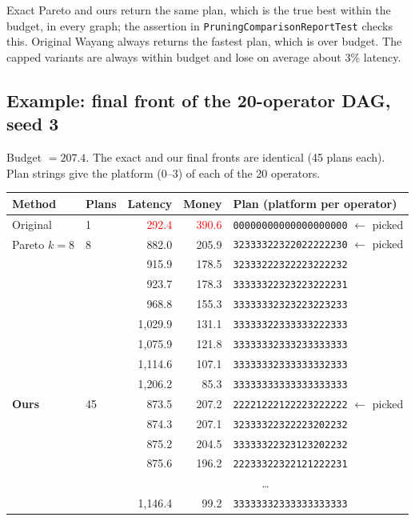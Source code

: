 \documentclass[10pt,a4paper]{article}
\begin{document}
\noindent
Exact Pareto and ours return the same plan, which is the true best within the budget, in every graph; the assertion
in \texttt{PruningComparisonReportTest} checks this. Original Wayang always returns the fastest plan, which is over budget.
The capped variants are always within budget and lose on average about 3\% latency.

\subsection{Example: final front of the 20-operator DAG, seed 3}
Budget $= 207.4$. The exact and our final fronts are identical (45 plans each). Plan strings give the platform (0--3) of each of the 20 operators.
\begin{center}\small
\begin{tabular}{@{}llrrl@{}}
\toprule
Method & Plans & Latency & Money & Plan (platform per operator)\\
\midrule
Original & 1 & \textcolor{red}{292.4} & \textcolor{red}{390.6} & \texttt{00000000000000000000} $\leftarrow$ picked\\
\midrule
Pareto $k{=}8$ & 8 & {882.0} & {205.9} & \texttt{32333322322022222230} $\leftarrow$ picked\\
 &  & {915.9} & {178.5} & \texttt{32333222322223222232}\\
 &  & {923.7} & {178.3} & \texttt{33333322323223222231}\\
 &  & {968.8} & {155.3} & \texttt{33333332323223223233}\\
 &  & {1{,}029.9} & {131.1} & \texttt{33333322333333222333}\\
 &  & {1{,}075.9} & {121.8} & \texttt{33333332333233333333}\\
 &  & {1{,}114.6} & {107.1} & \texttt{33333332333333332333}\\
 &  & {1{,}206.2} & {85.3} & \texttt{33333333333333333333}\\
\midrule
\textbf{Ours} & 45 & {873.5} & {207.2} & \texttt{22221222122223222222} $\leftarrow$ picked\\
 &  & {874.3} & {207.1} & \texttt{32333322322223202232}\\
 &  & {875.2} & {204.5} & \texttt{33333322323123202232}\\
 &  & {875.6} & {196.2} & \texttt{22233322322121222231}\\
 &  & \multicolumn{3}{c}{\dots}\\
 &  & {1{,}146.4} & {99.2} & \texttt{33333332333333333333}\\

\end{tabular}
\end{center}
\end{document}
